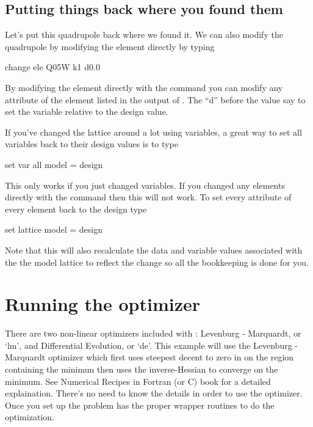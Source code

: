 \subsection{Putting things back where you found them}
\label{ss:put_it_back}

Let's put this quadrupole back where we found it. We can also modify the quadrupole
by modifying the element directly by typing
\begin{example}
  change ele Q05W k1 d0.0
\end{example}
By modifying the element directly with the  command you can
modify any attribute of the element listed in the output of .
The ``d'' before the value say to set the variable relative to the design value.

If you've changed the lattice around a lot using variables, a great way to set
all variables back to their design values is to type
\begin{example}
  set var all model = design
\end{example}
This only works if you just changed variables. If you changed any elements
directly with the  command then this will not work. To set
every attribute of every element back to the design type
\begin{example}
  set lattice model = design
\end{example}
Note that this will also recalculate the data and variable values associated with the
the model lattice to reflect the change so all the bookkeeping is done for you.


\section{Running the optimizer}
\label{s:optimizer}

There are two non-linear optimizers included with \tao: Levenburg - Marquardt,
or `lm', and
Differential Evolution, or `de'. This example will use the 
Levenburg - Marquardt optimizer which first uses steepest decent to zero in on
the region containing the minimun then uses the inverse-Hessian to converge on
the minimum. See Numerical Recipes in Fortran (or C) book for a detailed
explaination. There's no need to know the details in order to use the
optimizer. Once you set up the problem \tao has the proper wrapper routines to
do the optimization.

